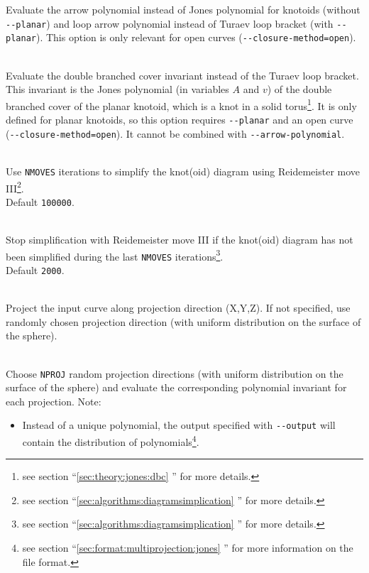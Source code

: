 \begin{description}
  Evaluate the arrow polynomial instead of Jones polynomial for knotoids (without \lstinline{--planar}) and loop arrow polynomial instead of Turaev loop bracket (with \lstinline{--planar}). This option is only relevant for open curves (\lstinline{--closure-method=open}).
\item[\lstinline{--double-branched-cover}]\hfill\\
  Evaluate the double branched cover invariant instead of the Turaev loop bracket. This invariant is the Jones polynomial (in variables $A$ and $v$) of the double branched cover of the planar knotoid, which is a knot in a solid torus\footnote{see section ``\ref{sec:theory:jones:dbc} '' for more details.}. It is only defined for planar knotoids, so this option requires \lstinline{--planar} and an open curve (\lstinline{--closure-method=open}). It cannot be combined with \lstinline{--arrow-polynomial}.
\item[\lstinline{--nb-moves-III=NMOVES}]\hfill\\
  Use \lstinline{NMOVES} iterations to simplify the knot(oid) diagram using Reidemeister move III\footnote{see section  ``\ref{sec:algorithms:diagramsimplication} '' for more details.}.\\
  Default \lstinline{100000}.
\item[\lstinline{--nb-unsuccessfull-moves-III=NMOVES}]\hfill\\
  Stop simplification with Reidemeister move III if the knot(oid) diagram has not been simplified during the last \lstinline{NMOVES} iterations\footnote{see section  ``\ref{sec:algorithms:diagramsimplication} '' for more details.}.\\
  Default \lstinline{2000}.
\item[\lstinline{--projection="X,Y,Z"}]\hfill\\ Project the input curve along projection direction (X,Y,Z). If not specified, use randomly chosen projection direction (with uniform distribution on the surface of the sphere).
\item[\lstinline{-N NPROJ}, \lstinline{--nb-projections=NPROJ}]\hfill\\
  Choose \lstinline{NPROJ} random projection directions (with uniform distribution on the surface of the sphere) and evaluate the corresponding polynomial invariant for each projection. Note:
  \begin{itemize}
  \item Instead of a unique polynomial, the output specified with \lstinline{--output} will contain the distribution of polynomials\footnote{see section ``\ref{sec:format:multiprojection:jones} '' for more information on the file format.}. 

\end{itemize}
\end{description}
